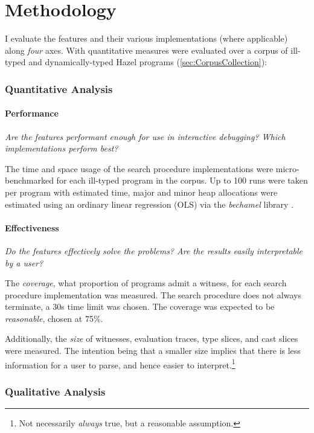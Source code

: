 \section{Methodology}\label{sec:EvaluationMethodology}
I evaluate the features and their various implementations (where applicable) along \textit{four} axes. With quantitative measures were evaluated over a corpus of ill-typed and dynamically-typed Hazel programs (\cref{sec:CorpusCollection}):

\subsubsection{Quantitative Analysis}
\paragraph{Performance} \textit{Are the features performant enough for use in interactive debugging? Which implementations perform best?}

The time and space usage of the search procedure implementations were micro-benchmarked for each ill-typed program in the corpus. Up to 100 runs were taken per program with estimated time, major and minor heap allocations were estimated using an ordinary linear regression (OLS) via the \textit{bechamel} library \cite{Bechamel}.

\paragraph{Effectiveness} \textit{Do the features effectively solve the problems? Are the results easily interpretable by a user?}

The \textit{coverage},  what proportion of programs admit a witness, for each search procedure implementation was measured. The search procedure does not always terminate, a 30s time limit was chosen. The coverage was expected to be \textit{reasonable}, chosen at 75\%.

Additionally, the \textit{size} of witnesses, evaluation traces, type slices, and cast slices were measured. The intention being that a smaller size implies that there is less information for a user to parse, and hence easier to interpret.\footnote{Not necessarily \textit{always} true, but a reasonable assumption.}

\subsubsection{Qualitative Analysis}

